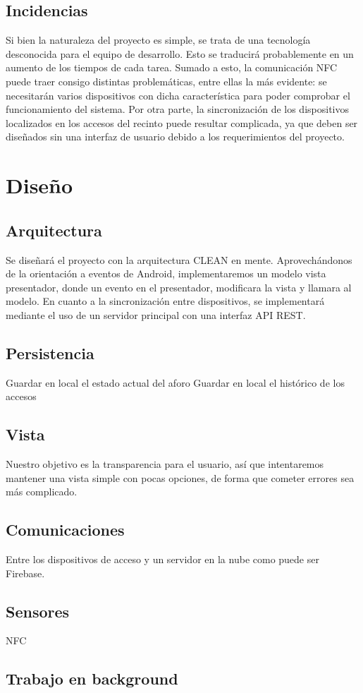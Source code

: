 \documentclass[a4paper,openright,12pt]{article}
\begin{document}
\subsection{Incidencias}
Si bien la naturaleza del proyecto es simple, se trata de una tecnología desconocida para el equipo de desarrollo. Esto se traducirá probablemente en un aumento de los tiempos de cada tarea.
Sumado a esto, la comunicación NFC puede traer consigo distintas problemáticas, entre ellas la más evidente: se necesitarán varios dispositivos con dicha característica para poder comprobar el funcionamiento del sistema.
Por otra parte, la sincronización de los dispositivos localizados en los accesos del recinto puede resultar complicada, ya que deben ser diseñados sin una interfaz de usuario debido a los requerimientos del proyecto.


\section{Diseño}
\subsection{Arquitectura}
Se diseñará el proyecto con la arquitectura CLEAN en mente.
Aprovechándonos de la orientación a eventos de Android, implementaremos un modelo vista presentador, donde un evento en el presentador, modificara la vista y llamara al modelo.
En cuanto a la sincronización entre dispositivos, se implementará mediante el uso de un servidor principal con una interfaz API REST.
\subsection{Persistencia}
Guardar en local el estado actual del aforo
Guardar en local el histórico de los accesos
\subsection{Vista}
Nuestro objetivo es la transparencia para el usuario, así que intentaremos mantener una vista simple con pocas opciones, de forma que cometer errores sea más complicado.
\subsection{Comunicaciones}
Entre los dispositivos de acceso y un servidor en la nube como puede ser Firebase.
\subsection{Sensores}
NFC
\subsection{Trabajo en background}





\end{document}
